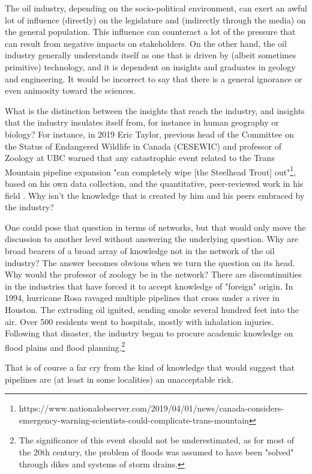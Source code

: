 \documentclass[12pt, man, natbib]{apa6}
\begin{document}
	The oil industry, depending on the socio-political environment, can exert an awful lot of influence (directly) on the legislature and (indirectly through the media) on the general population. This influence can counteract a lot of the pressure that can result from negative impacts on stakeholders. On the other hand, the oil industry generally understands itself as one that is driven by (albeit sometimes primitive) technology, and it is dependent on insights and graduates in geology and engineering. It would be incorrect to say that there is a general ignorance or even animosity toward the sciences.
	
	What is the distinction between the insights that reach the industry, and insights that the industry insulates itself from, for instance in human geography or biology? For instance, in 2019 Eric Taylor, previous head of the Committee on the Status of Endangered Wildlife in Canada (CESEWIC) and professor of Zoology at UBC warned that any catastrophic event related to the Trans Mountain pipeline expansion "can completely wipe [the Steelhead Trout] out"\footnote{https://www.nationalobserver.com/2019/04/01/news/canada-considers-emergency-warning-scientists-could-complicate-trans-mountain}, based on his own data collection, and the quantitative, peer-reviewed work in his field \citep{Neilson2018}. Why isn't the knowledge that is created by him and his peers embraced by the industry?
	
	One could pose that question in terms of networks, but that would only move the discussion to another level without answering the underlying question. Why are broad bearers of a broad array of knowledge not in the network of the oil industry? The answer becomes obvious when we turn the question on its head. Why would the professor of zoology be in the network? There are discontinuities in the industries that have forced it to accept knowledge of "foreign" origin. In 1994, hurricane Rosa ravaged multiple pipelines that cross under a river in Houston. The extruding oil ignited, sending smoke several hundred feet into the air. Over 500 residents went to hospitals, mostly with inhalation injuries. Following that disaster, the industry began to procure academic knowledge on flood plains and flood planning.\footnote{The significance of this event should not be underestimated, as for most of the 20th century, the problem of floods was assumed to have been "solved" through dikes and systems of storm drains.}
	
	That is of course a far cry from the kind of knowledge that would suggest that pipelines are (at least in some localities) an unacceptable risk.


\end{document}
